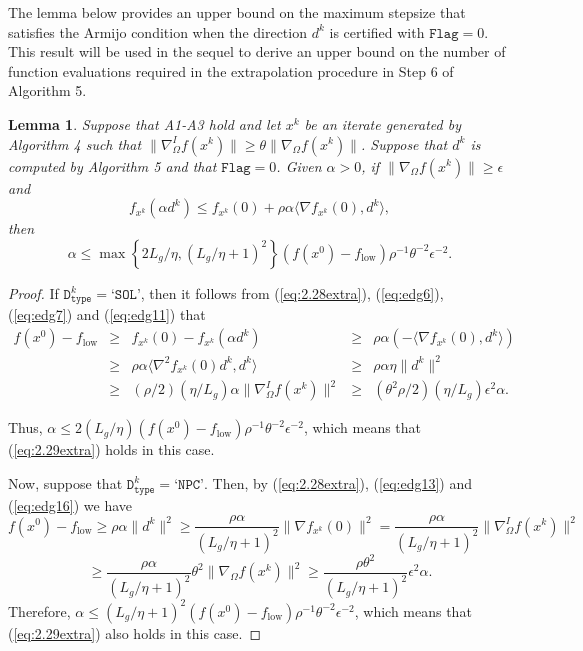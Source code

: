 \documentclass[11pt]{article}
\newtheorem{lemma}[theorem]{Lemma}
\begin{document}
The lemma below provides an upper bound on the maximum stepsize that satisfies the Armijo condition when the direction $d^{k}$ is certified with $\texttt{Flag}=0$. This result will be used in the sequel to derive an upper bound on the number of function evaluations required in the extrapolation procedure in Step 6 of Algorithm 5.

\begin{lemma}
\label{lem:2.4extra}
Suppose that A1-A3 hold and let $x^{k}$ be an iterate generated by Algorithm 4 such that $\|\nabla_{\Omega}^{I}f(x^{k})\|\geq\theta\|\nabla_{\Omega} f(x^{k})\|$. Suppose that $d^{k}$ is computed by Algorithm 5 and that $\texttt{Flag}=0$. Given $\alpha>0$, if $\|\nabla_{\Omega} f(x^{k})\|\geq\epsilon$ and
\begin{equation}
f_{x^{k}}(\alpha d^{k})\leq f_{x^{k}}(0)+\rho\alpha\langle\nabla f_{x^{k}}(0),d^{k}\rangle,
\label{eq:2.28extra}
\end{equation}
then
\begin{equation}
\alpha\leq \max\left\{2 L_{g}/\eta,(L_{g}/\eta+1)^{2}\right\}(f(x^{0})-f_{\mathrm{low}})\rho^{-1}\theta^{-2}\epsilon^{-2}.
\label{eq:2.29extra}    
\end{equation}
\end{lemma}

\begin{proof}
If $\texttt{D}_{\texttt{type}}^{k}=\texttt{`SOL'}$, then it follows from (\ref{eq:2.28extra}), (\ref{eq:edg6}), (\ref{eq:edg7}) and (\ref{eq:edg11}) that
\[
\begin{array}{lclcl}
f(x^{0})-f_{\mathrm{low}} & \geq & f_{x^{k}}(0)-f_{x^{k}}(\alpha d^{k}) & \geq & \rho\alpha\left(-\langle\nabla f_{x^{k}}(0),d^{k}\rangle\right) \\[2mm]
& \geq & \rho\alpha\langle\nabla^{2}f_{x^{k}}(0)d^{k},d^{k}\rangle & \geq &  \rho\alpha\eta\|d^{k}\|^{2}\\[2mm]
& \geq & (\rho/2)(\eta/L_g)\alpha\|\nabla_{\Omega}^{I}f(x^{k})\|^{2} & \geq & (\theta^2 \rho / 2)(\eta/L_g)\epsilon^{2}\alpha.
\end{array}
\]

Thus, $\alpha\leq 2(L_g/\eta)\left(f(x^{0})-f_{\mathrm{low}}\right)\rho^{-1}\theta^{-2}\epsilon^{-2}$, which means that (\ref{eq:2.29extra}) holds in this case. 

Now, suppose that $\texttt{D}_{\texttt{type}}^{k}=\texttt{`NPC'}$. Then, by (\ref{eq:2.28extra}), (\ref{eq:edg13}) and (\ref{eq:edg16}) we have
\[
f(x^{0})-f_{\mathrm{low}} \geq \rho\alpha\|d^{k}\|^{2}\geq \frac{\rho\alpha}{(L_g/\eta+1)^2}\|\nabla f_{x^{k}}(0)\|^{2}=\frac{\rho\alpha}{(L_g/\eta+1)^2}\|\nabla_{\Omega}^{I}f(x^{k})\|^{2}
\]
\[
\geq \frac{\rho\alpha}{(L_g/\eta+1)^2}\theta^{2}\|\nabla_{\Omega}f(x^{k})\|^{2}\geq\frac{\rho\theta^{2}}{(L_g/\eta+1)^2}\epsilon^{2}\alpha.
\]
Therefore, $\alpha\leq \left(L_{g}/\eta+1\right)^{2}\left(f(x^{0})-f_{\mathrm{low}}\right)\rho^{-1}\theta^{-2}\epsilon^{-2}$, which means that (\ref{eq:2.29extra}) also holds in this case. 
\end{proof}
\end{document}
